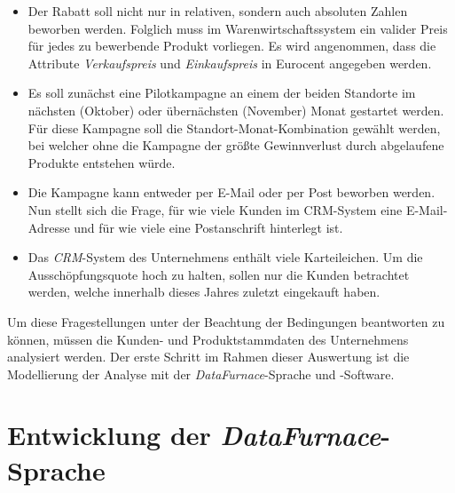 \documentclass[
  language=german, %
  type=bachelor,%
  ngerman
]{isthesis}
\begin{document}
\begin{content}
  \begin{itemize}

    \item Der Rabatt soll nicht nur in relativen, sondern auch absoluten Zahlen
      beworben werden. Folglich muss im Warenwirtschaftssystem ein valider
      Preis für jedes zu bewerbende Produkt vorliegen. Es wird angenommen, dass
      die Attribute \textit{Verkaufspreis} und \textit{Einkaufspreis} in
      Eurocent angegeben werden.

    \item Es soll zunächst eine Pilotkampagne an einem der beiden Standorte im
      nächsten (Oktober) oder übernächsten (November) Monat gestartet werden.
      Für diese Kampagne soll die Standort-Monat-Kombination gewählt werden,
      bei welcher ohne die Kampagne der größte Gewinnverlust durch abgelaufene
      Produkte entstehen würde.

    \item Die Kampagne kann entweder per E-Mail oder per Post beworben werden.
      Nun stellt sich die Frage, für wie viele Kunden im \acrshort{CRM}-System
      eine E-Mail-Adresse und für wie viele eine Postanschrift hinterlegt ist.

    \item Das \textit{CRM}-System des Unternehmens enthält viele Karteileichen.
      Um die Ausschöpfungsquote hoch zu halten, sollen nur die Kunden
      betrachtet werden, welche innerhalb dieses Jahres zuletzt eingekauft
      haben.

  \end{itemize}

  Um diese Fragestellungen unter der Beachtung der Bedingungen beantworten zu
  können, müssen die Kunden- und Produktstammdaten des Unternehmens analysiert
  werden. Der erste Schritt im Rahmen dieser Auswertung ist die Modellierung
  der Analyse \zB{} mit der \textit{DataFurnace}-Sprache und -Software.

  \chapter{Entwicklung der \textit{DataFurnace}-Sprache}\label{ch:entwicklung-datafurnace-sprache}




\end{content}
\end{document}
